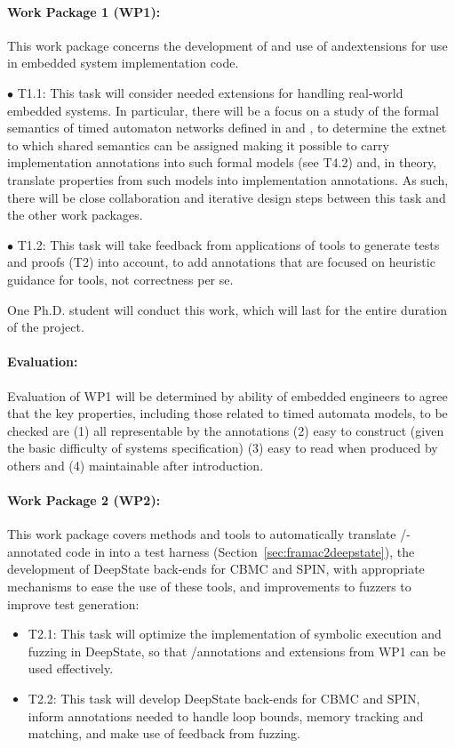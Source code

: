 \paragraph{Work Package 1 (WP1):}  This work package concerns the
development of and use of \acsl and\eacsl extensions for use in
embedded system implementation
code.


$\bullet$ T1.1: This task will consider needed extensions for handling
real-world embedded systems.  In particular, there will be a focus on
a study of the formal semantics of timed
automaton networks defined in \uppaal and \prism, to determine the
extnet to which shared semantics can be assigned making it possible to
carry implementation annotations into such formal models (see T4.2)
and, in theory, translate properties from such models into implementation annotations.  As such, there will be close collaboration and iterative design steps between this task and the other work packages. %

$\bullet$ T1.2: This task will take feedback from applications of
tools to generate tests and proofs (T2) into account, to add annotations
that are focused on heuristic guidance for tools, not correctness per se.

One Ph.D. student will conduct this work, which will last for the entire duration of the project.

\paragraph{Evaluation:} Evaluation of
WP1 will be determined by ability of embedded engineers to agree that
the key properties, including those related to timed automata models, to be checked are (1) all representable by the
annotations (2) easy to construct (given the basic difficulty of
systems specification) (3) easy to read when produced by others and
(4) maintainable after introduction.

\paragraph{Work Package 2 (WP2):}  This work package covers
methods and tools to automatically translate \acsl/\eacsl-annotated code in
into a \deepstate test harness (Section~\ref{sec:framac2deepstate}),
the development of DeepState back-ends for CBMC and SPIN, with
appropriate mechanisms to ease the use of these tools, and
improvements to fuzzers to improve test generation:
\begin{itemize}[labelsep=3pt,leftmargin=12pt]
\item T2.1: This task will optimize the implementation of symbolic
  execution and fuzzing in DeepState, so that \acsl/\eacsl annotations
  and extensions from WP1 can be used effectively.
\item T2.2: This task will develop DeepState back-ends for CBMC and
  SPIN, inform annotations needed to handle loop bounds,
  memory tracking and matching, and make use of feedback from fuzzing.
\end{itemize}

